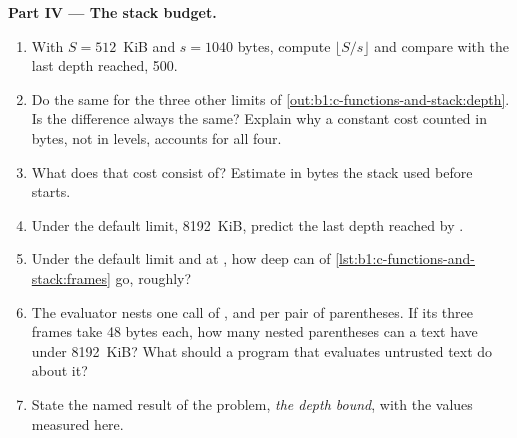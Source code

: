 \begin{problem}
\medskip\noindent\textbf{Part IV --- The stack budget.}
\begin{enumerate}[resume]
\item With $S = 512$~KiB and $s = 1040$ bytes, compute $\lfloor S / s \rfloor$ and compare with the last depth
reached, 500.
\item Do the same for the three other limits of \cref{out:b1:c-functions-and-stack:depth}. Is the difference
always the same? Explain why a constant cost counted in bytes, not in levels, accounts for all four.
\item What does that cost consist of? Estimate in bytes the stack used before  starts.
\item Under the default limit, 8192~KiB, predict the last depth reached by .
\item Under the default limit and at , how deep can  of \cref{lst:b1:c-functions-and-stack:frames}
go, roughly?
\item The evaluator nests one call of ,  and  per pair of parentheses. If its
three frames take 48 bytes each, how many nested parentheses can a text have under 8192~KiB? What should a program
that evaluates untrusted text do about it?
\item State the named result of the problem, \emph{the depth bound}, with the values measured here.
\end{enumerate}
\end{problem}

